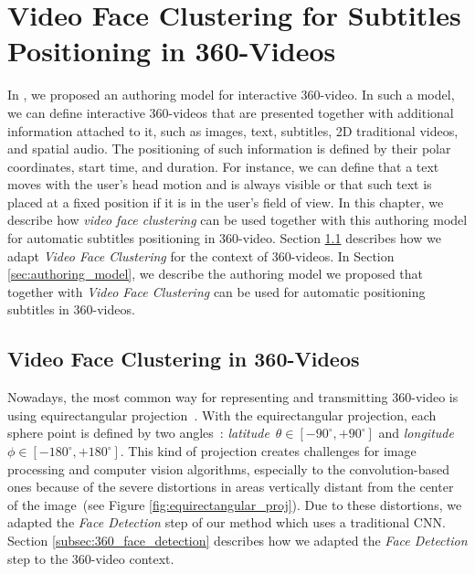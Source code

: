 \newpage
\chapter{Video Face Clustering for Subtitles Positioning in 360-Videos}
\label{chap:subtitles_positioning}

In \cite{mendes2020authoring}, we proposed an authoring model for interactive 360-video. In such a model, we can define interactive 360-videos that are presented together with additional information attached to it, such as images, text, subtitles, 2D traditional videos, and spatial audio. The positioning of such information is defined by their polar coordinates, start time, and duration. For instance, we can define that a text moves with the user's head motion and is always visible or that such text is placed at a fixed position if it is in the user's field of view. In this chapter, we describe how \emph{video face clustering} can be used together with this authoring model for automatic subtitles positioning in 360-video. Section \ref{sec:authoring_clustering_360} describes how we adapt \emph{Video Face Clustering} for the context of 360-videos. In Section \ref{sec:authoring_model}, we describe the authoring model we proposed that together with \emph{Video Face Clustering} can be used for automatic positioning subtitles in 360-videos.
 
\section{Video Face Clustering in 360-Videos}

\label{sec:authoring_clustering_360}

Nowadays, the most common way for representing and transmitting 360-video is using equirectangular projection~\cite{yang2018object}. With the equirectangular projection, each sphere point is defined by two angles~\cite{snyder1987map}: \emph{latitude}~$\theta \in [-90^{\circ}, +90^{\circ}]$ and \emph{longitude}~$\phi \in [-180^{\circ}, +180^{\circ}]$. This kind of projection creates challenges for image processing and computer vision algorithms, especially to the convolution-based ones because of the severe distortions in areas vertically distant from the center of the image~(see Figure \ref{fig:equirectangular_proj}). Due to these distortions, we adapted the \emph{Face Detection} step of our method which uses a traditional CNN. Section \ref{subsec:360_face_detection} describes how we adapted the \emph{Face Detection} step to the 360-video context.

